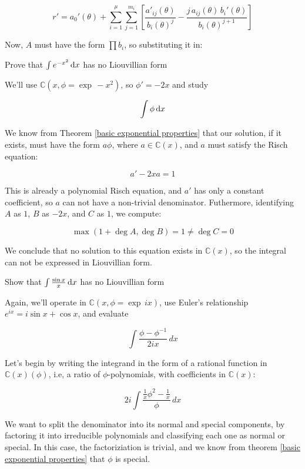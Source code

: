 $$r' = a_0'(\theta) + \sum_{i=1}^\mu \sum_{j=1}^{m_i} \left[
\frac{a'_{ij}(\theta)}{b_i(\theta)^j} - \frac{j\, a_{ij}(\theta)\,
b_i'(\theta)}{b_i(\theta)^{j+1}} \right]$$

Now, $A$ must have the form $\prod b_i$, so substituting it in:


\example Prove that $\int e^{-x^2}\, {\rm d}x$ has no Liouvillian form

We'll use ${\mathbb C}(x, \phi = \exp\, -x^2)$, so $\phi' = -2x$ and
study

$$\int \phi \, {\rm d}x$$

We know from Theorem \ref{basic exponential properties} that our
solution, if it exists, must have the form $a\phi$, where $a \in
{\mathbb C}(x)$, and $a$ must satisfy the Risch equation:

$$a' - 2x a = 1$$

This is already a polynomial Risch equation, and $a'$ has only
a constant coefficient, so $a$ can not have a non-trivial denominator.
Futhermore, identifying $A$ as $1$, $B$ as $-2x$, and $C$ as $1$, we compute:

$$\max(1 + \deg A, \deg B) = 1 \ne \deg C = 0$$

We conclude that no solution to this equation exists in ${\mathbb C}(x)$,
so the integral can not be expressed in Liouvillian form.

\endexample


\example Show that $\int \frac{\sin x}{x} \, {\rm d}x$ has no Liouvillian form

Again, we'll operate in ${\mathbb C}(x, \phi = \exp \,ix)$, use
Euler's relationship $e^{ix}=i\sin x + \cos x$, and evaluate

$$\int \frac{\phi - \phi^{-1}}{2ix} \,dx$$

Let's begin by writing the integrand in the form of a rational
function in ${\mathbb C}(x)(\phi)$, i.e, a ratio
of $\phi$-polynomials, with coefficients in ${\mathbb C}(x)$:

$$2i \int \frac{\frac{1}{x}\phi^2 - \frac{1}{x}}{\phi} \,dx$$

We want to split the denominator into its normal and special
components, by factoring it into irreducible polynomials and
classifying each one as normal or special.  In this case, the
factoriziation is trivial, and we know from theorem \ref{basic
exponential properties} that $\phi$ is special.

